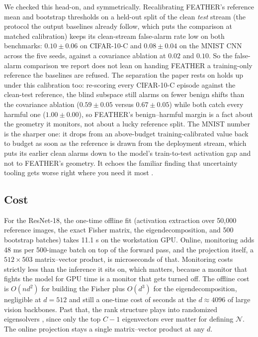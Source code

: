 \documentclass[graybox]{SNmult}
\begin{document}
We checked this head-on, and symmetrically. Recalibrating FEATHER's reference
mean and bootstrap thresholds on a held-out split of the clean \emph{test}
stream (the protocol the output baselines already follow, which puts the
comparison at matched calibration) keeps its clean-stream false-alarm rate
low on both benchmarks: $0.10 \pm 0.06$ on CIFAR-10-C and $0.08 \pm 0.04$ on
the MNIST CNN across the five seeds, against a covariance ablation at $0.02$
and $0.10$. So the false-alarm comparison we report does not lean on handing
FEATHER a training-only reference the baselines are refused. The separation
the paper rests on holds up under this calibration too: re-scoring every
CIFAR-10-C episode against the clean-test reference, the blind subspace still
alarms on fewer benign shifts than the covariance ablation ($0.59 \pm 0.05$
versus $0.67 \pm 0.05$) while both catch every harmful one ($1.00 \pm 0.00$),
so FEATHER's benign--harmful margin is a fact about the geometry it monitors,
not about a lucky reference split. The MNIST number is the sharper one: it
drops from an above-budget training-calibrated value back to budget as soon as
the reference is drawn from the deployment stream, which puts its earlier
clean alarms down to the model's train-to-test activation gap and not to
FEATHER's geometry. It echoes the familiar finding that uncertainty tooling
gets worse right where you need it most \cite{ovadia2019trust}.

\subsection{Cost}

For the ResNet-18, the one-time offline fit (activation extraction over
50{,}000 reference images, the exact Fisher matrix, the eigendecomposition,
and 500 bootstrap batches) takes 11.1 s on the workstation GPU. Online,
monitoring adds 48 ms per 500-image batch on top of the forward pass, and the
projection itself, a $512 \times 503$ matrix--vector product, is microseconds
of that. Monitoring costs strictly less than the inference it sits on, which
matters, because a monitor that fights the model for GPU time is a monitor
that gets turned off. The offline cost is $O(nd^2)$ for building the Fisher
plus $O(d^3)$ for the eigendecomposition, negligible at $d = 512$ and still a
one-time cost of seconds at the $d \approx 4096$ of large vision backbones.
Past that, the rank structure plays into randomized eigensolvers
\cite{halko2011structure}, since only the top $C-1$ eigenvectors ever matter
for defining $\mathcal{N}$. The online projection stays a single
matrix--vector product at any $d$.
\end{document}
